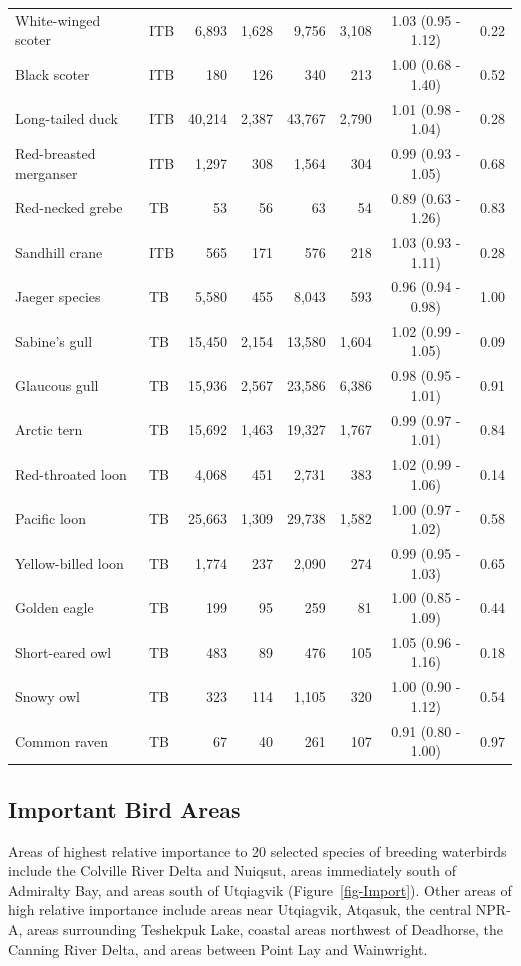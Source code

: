 \documentclass[
]{article}
\begin{document}
\begin{longtable}[t]{llrrrrcc}
White-winged scoter & ITB & 6,893 & 1,628 & 9,756 & 3,108 & 1.03 (0.95 - 1.12) & 0.22\\
Black scoter & ITB & 180 & 126 & 340 & 213 & 1.00 (0.68 - 1.40) & 0.52\\
Long-tailed duck & ITB & 40,214 & 2,387 & 43,767 & 2,790 & 1.01 (0.98 - 1.04) & 0.28\\
Red-breasted merganser & ITB & 1,297 & 308 & 1,564 & 304 & 0.99 (0.93 - 1.05) & 0.68\\
\addlinespace
Red-necked grebe & TB & 53 & 56 & 63 & 54 & 0.89 (0.63 - 1.26) & 0.83\\
Sandhill crane & ITB & 565 & 171 & 576 & 218 & 1.03 (0.93 - 1.11) & 0.28\\
Jaeger species & TB & 5,580 & 455 & 8,043 & 593 & 0.96 (0.94 - 0.98) & 1.00\\
Sabine's gull & TB & 15,450 & 2,154 & 13,580 & 1,604 & 1.02 (0.99 - 1.05) & 0.09\\
Glaucous gull & TB & 15,936 & 2,567 & 23,586 & 6,386 & 0.98 (0.95 - 1.01) & 0.91\\
\addlinespace
Arctic tern & TB & 15,692 & 1,463 & 19,327 & 1,767 & 0.99 (0.97 - 1.01) & 0.84\\
Red-throated loon & TB & 4,068 & 451 & 2,731 & 383 & 1.02 (0.99 - 1.06) & 0.14\\
Pacific loon & TB & 25,663 & 1,309 & 29,738 & 1,582 & 1.00 (0.97 - 1.02) & 0.58\\
Yellow-billed loon & TB & 1,774 & 237 & 2,090 & 274 & 0.99 (0.95 - 1.03) & 0.65\\
Golden eagle & TB & 199 & 95 & 259 & 81 & 1.00 (0.85 - 1.09) & 0.44\\
\addlinespace
Short-eared owl & TB & 483 & 89 & 476 & 105 & 1.05 (0.96 - 1.16) & 0.18\\
Snowy owl & TB & 323 & 114 & 1,105 & 320 & 1.00 (0.90 - 1.12) & 0.54\\
Common raven & TB & 67 & 40 & 261 & 107 & 0.91 (0.80 - 1.00) & 0.97\\
\bottomrule

\end{longtable}

\endgroup{}

\subsection*{Important Bird Areas}\label{important-bird-areas-1}

Areas of highest relative importance to 20 selected species of breeding
waterbirds include the Colville River Delta and Nuiqsut, areas
immediately south of Admiralty Bay, and areas south of Utqiagvik
(Figure~\ref{fig-Import}). Other areas of high relative importance
include areas near Utqiagvik, Atqasuk, the central NPR-A, areas
surrounding Teshekpuk Lake, coastal areas northwest of Deadhorse, the
Canning River Delta, and areas between Point Lay and Wainwright.
\end{document}
